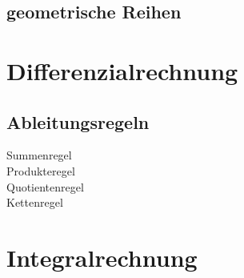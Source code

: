\documentclass[a4paper,10pt,fleqn]{article}
\begin{document}
\subsection{geometrische Reihen}

\section{Differenzialrechnung}
\subsection{Ableitungsregeln}
Summenregel\\
Produkteregel\\
Quotientenregel\\
Kettenregel\\

\section{Integralrechnung}
\end{document}
